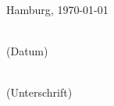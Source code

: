 \vspace{1cm}
Hamburg, \today\\[-1ex]
\mbox{}\hspace{2.2cm}\parbox[t]{4cm}{\centering \dotfill\\(Datum)}\hspace{0.5cm}
					\parbox[t]{8cm}{\centering \dotfill\\(Unterschrift)}
					
\cleardoublepage
\listoftables
\lstlistoflistings



 


\cleardoublepage
\tableofcontents


%

\newpage


